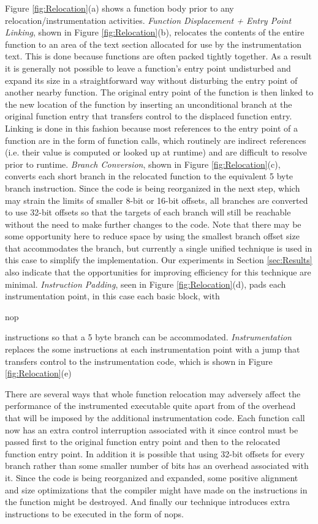 Figure \ref{fig:Relocation}(a) shows a function body prior to any relocation/instrumentation activities.
\textit{Function Displacement + Entry Point Linking}, shown in Figure \ref{fig:Relocation}(b),
relocates the contents of the entire function to an area of the text section allocated
for use by the instrumentation text. 
This is done because functions are often packed tightly together. 
As a result it is generally not possible to leave a function's entry point undisturbed and
expand its size in a straightforward way without disturbing the entry point 
of another nearby function. The original entry point of the function is then linked to the new location
of the function by inserting an unconditional branch at the original 
function entry that transfers control to the displaced function entry. 
Linking is done in this fashion because most references to the entry point of a function are in the form of function calls, which
routinely are indirect references (i.e. their value is computed or looked up at runtime) and are difficult to resolve
prior to runtime. \textit{Branch Conversion}, shown in Figure \ref{fig:Relocation}(c), 
converts each short branch in the relocated function to the equivalent
5 byte branch instruction. Since the code is being reorganized in the next step, which may strain the limits of
smaller 8-bit or 16-bit offsets, all branches are converted to use 32-bit offsets so that the targets of each branch
will still be reachable without the need to make further changes to the code. Note that there may be some opportunity
here to reduce space by using the smallest branch offset size that accommodates the branch, but currently a single 
unified technique is used in this case to simplify the implementation. Our experiments in Section \ref{sec:Results}
also indicate that the opportunities for improving efficiency for this technique are minimal. \textit{Instruction Padding}, seen
in Figure \ref{fig:Relocation}(d), pads
each instrumentation point, in this case each basic block, with \begin{it}nop\end{it} instructions so that a 5 byte branch can be accommodated. \textit{Instrumentation} replaces the
some instructions at each instrumentation point with a jump that transfers control to the instrumentation code, which is shown in Figure
\ref{fig:Relocation}(e)

There are several ways that whole function relocation may adversely affect 
the performance of the instrumented executable quite apart from of the overhead
that will be imposed by the additional instrumentation code. Each function call
now has an extra control interruption associated with it since control must be passed first to the original function entry
point and then to the relocated function entry point. In addition it is possible that using 32-bit offsets for every branch rather than
some smaller number of bits has an overhead associated with it. Since the code is being reorganized and expanded, 
some positive alignment and size optimizations that the compiler might have made on the instructions in the
function might be destroyed. And finally our technique introduces extra instructions to be executed in the form of nops.

